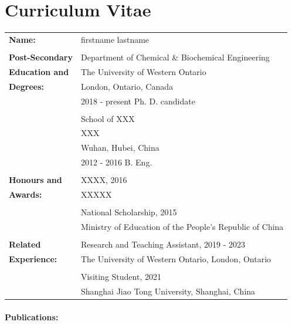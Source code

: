 \chapter*{Curriculum Vitae}
\begin{refsection}
\nocite{deng2017volumetric}

\begin{table}[!h]
\begin{tabular}{ll}
\textbf{Name:} & firstname lastname\\\\
\textbf{Post-Secondary} & Department of Chemical \& Biochemical Engineering\\
\textbf{Education and}& The University of Western Ontario\\
\textbf{Degrees:}& London, Ontario, Canada\\
& 2018 - present \quad Ph. D. candidate\\
\\
& School of XXX \\
& XXX \\
& Wuhan, Hubei, China\\
& 2012 - 2016 \quad B. Eng.\\
\\
\textbf{Honours and}& XXXX, 2016 \\
\textbf{Awards:} & XXXXX\\
& \\
& National Scholarship, 2015\\
& Ministry of Education of the People's Republic of China\\
& \\
\textbf{Related }& Research and Teaching Assistant, 2019 - 2023\\
\textbf{Experience:}& The University of Western Ontario, London, Ontario\\
& \\
& Visiting Student, 2021 \\
& Shanghai Jiao Tong University, Shanghai, China\\
\end{tabular}
\end{table}

\subsubsection*{Publications:}
\begin{singlespace}
    \printbibliography[heading=none]
\end{singlespace}
\end{refsection}
